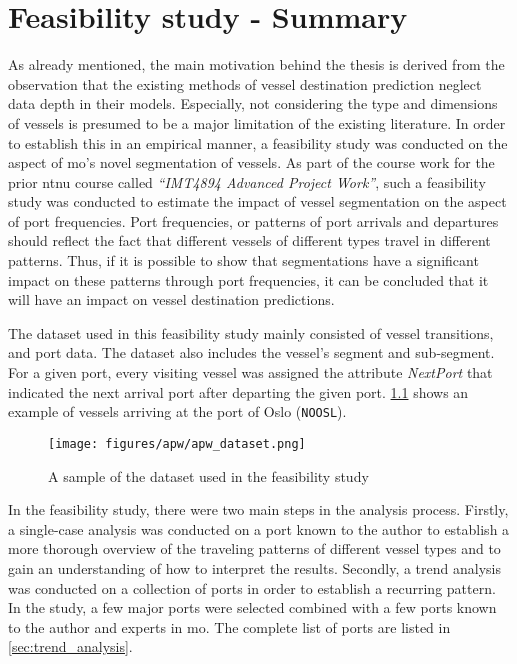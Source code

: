 \chapter{Feasibility study - Summary}

As already mentioned, the main motivation behind the thesis is derived from the observation that the existing methods of vessel destination prediction neglect data depth in their models. Especially, not considering the type and dimensions of vessels is presumed to be a major limitation of the existing literature. In order to establish this in an empirical manner, a feasibility study was conducted on the aspect of \acrfull{mo}'s novel segmentation of vessels. As part of the course work for the prior \acrshort{ntnu} course called \textit{“IMT4894 Advanced Project Work”}, such a feasibility study was  conducted to estimate the impact of vessel segmentation on the aspect of port frequencies. Port frequencies, or patterns of port arrivals and departures should reflect the fact that different vessels of different types travel in different patterns. Thus, if it is possible to show that segmentations have a significant impact on these patterns through port frequencies, it can be concluded that it will have an impact on vessel destination predictions.

The dataset used in this feasibility study mainly consisted of vessel transitions, and port data. The dataset also includes the vessel's segment and sub-segment. For a given port, every visiting vessel was assigned the attribute \textit{NextPort} that indicated the next arrival port after departing the given port. \cref{fig:apw_dataset} shows an example of vessels arriving at the port of Oslo (\texttt{NOOSL}).

\begin{figure}[htbp]
    \centering
    \texttt{[image: figures/apw/apw\_dataset.png]}
    \caption{A sample of the dataset used in the feasibility study}
    \label{fig:apw_dataset}
\end{figure}

In the feasibility study, there were two main steps in the analysis process. Firstly, a single-case analysis was conducted on a port known to the author to establish a more thorough overview of the traveling patterns of different vessel types and to gain an understanding of how to interpret the results. Secondly, a trend analysis was conducted on a collection of ports in order to establish a recurring pattern. In the study, a few major ports were selected combined with a few ports known to the author and experts in \acrshort{mo}. The complete list of ports are listed in \cref{sec:trend_analysis}.

